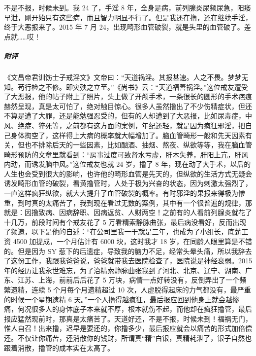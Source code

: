 \begin{case}
    不是不报，时候未到。我 24 了，手淫 8 年，全身是病，前列腺炎尿频尿急，阳痿早泄，刚开始只有这些病，而且智力明显不行了。但是我还在撸，还在继续手淫，终于大恶报来了。2015 年 7 月 24，出现畸形血管破裂，就是头里的血管破了。差点就……哎！
    \subparagraph{附评} 《文昌帝君训饬士子戒淫文》文帝曰：“天道祸淫。其报甚速。人之不畏。梦梦无知。苟行检之不修。即灾殃之立至。”《尚书》云：“天道福善祸淫。”这位戒友遭受了大恶报，他的帖子附上了照片，头上做了开颅手术，一条很长的圆形的手术疤痕赫然呈现，真是太可怕了，绝对触目惊心。很多人虽然撸出了不少伤精症状，但还不算是遭了大罪，还是能勉强忍受的，但有的人却遭到了大恶报，比如尿毒症，中风、绝症、猝死等，之前都有这方面的案例，年纪还轻，就是因为疯狂邪淫，把自己身体掏空了，这样得上大病的概率就大幅增加了。脑血管畸形一般和先天因素有关，但也不排除后天的一些因素，比如酗酒、抽烟、熬夜、纵欲等等，我在脑血管畸形预防的文章里就看到：“房事过度可致肾水亏虚，肝木失养，肝阳上亢，肝风内动，而诱发脑中风。”这位戒友也就 24 岁，撸了 8 年，现在动了大手术，以后的人生也会受到很大的影响，也许他的畸形血管是先天的，但纵欲的生活方式无疑会诱发畸形血管的破裂，看黄撸管时，人处于极为兴奋的状态，因为刺激太强烈了，一直这样疯狂纵欲，就大大提升了血管破裂的概率。有时邪淫的果报来得极为惨重，到时真的太痛苦了，我到现在看过无数的案例，其中有一个很普遍的规律，那就是：因撸致病、因病辞职、因病返贫、人财两空！之前有的人看前列腺炎就花了十几万，前段时间有个戒友花了 5 万看精索静脉曲张，最后病没看好，反而出现了频遗，以下是他的自述：“在公司里我一干就是三年，也成为了小组长，底薪工资 4500 加提成，一个月估计有 6000 块，这时我才 18 岁，在同龄人眼里算是不错的。但是因为 SY 惹下的后遗症，导致我的脑力不足，经常头晕头痛，所以我辞去了这份工作，我跟我爸爸说，爸爸就带我去医院检查了，医院说是神经衰弱。2015 年的经历让我永世难忘，为了治精索静脉曲张我到了河北、北京、辽宁、湖南、广东、江苏、上海，前前后后花了 5 万块，病情一点好转没有，反倒弄出了一个频繁遗精，连续 5 个月每个月遗精超过 10 次，人虚脱得起床的力气都没有，最严重的时候一个星期遗精 6 天。”一个人撸得越疯狂，最后报应回到他身上就会越惨痛，何况很多人的身体底子本来就不厚，根本就伤不起，而他却在疯狂撸管，最后报应猛然现前时，那真是太痛苦了。天道好还，不是不报，时候未到！福祸无门，惟人自召！出来撸，迟早是要还的，你撸多少，最后报应就会以痛苦的形式加倍偿还。不仅让你痛苦，还消散你的钱财，所谓真“精”白银，真精耗泄了，银子自然也跟着消散，撸管的成本实在太高了。
\end{case}

